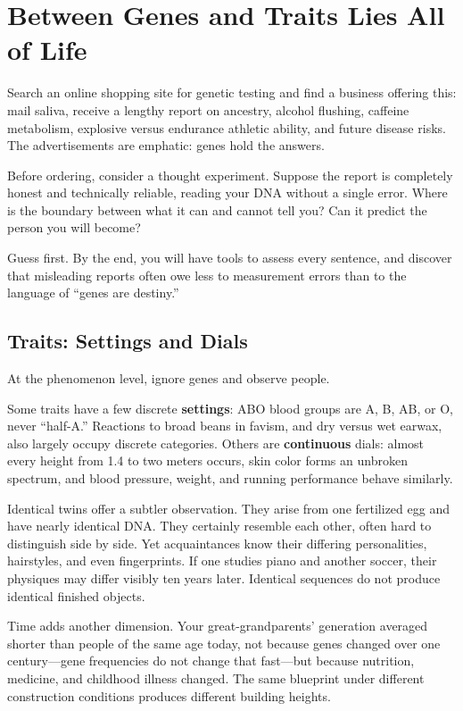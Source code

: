 \chapter{Between Genes and Traits Lies All of Life}

\begin{kaichang}
Search an online shopping site for genetic testing and find a business offering this: mail saliva, receive a lengthy report on ancestry, alcohol flushing, caffeine metabolism, explosive versus endurance athletic ability, and future disease risks. The advertisements are emphatic: genes hold the answers.

Before ordering, consider a thought experiment. Suppose the report is completely honest and technically reliable, reading your DNA without a single error. Where is the boundary between what it can and cannot tell you? Can it predict the person you will become?

Guess first. By the end, you will have tools to assess every sentence, and discover that misleading reports often owe less to measurement errors than to the language of ``genes are destiny.''
\end{kaichang}

\section{Traits: Settings and Dials}

At the phenomenon level, ignore genes and observe people.

Some traits have a few discrete \textbf{settings}: ABO blood groups are A, B, AB, or O, never ``half-A.'' Reactions to broad beans in favism, and dry versus wet earwax, also largely occupy discrete categories. Others are \textbf{continuous} dials: almost every height from 1.4 to two meters occurs, skin color forms an unbroken spectrum, and blood pressure, weight, and running performance behave similarly.

Identical twins offer a subtler observation. They arise from one fertilized egg and have nearly identical DNA. They certainly resemble each other, often hard to distinguish side by side. Yet acquaintances know their differing personalities, hairstyles, and even fingerprints. If one studies piano and another soccer, their physiques may differ visibly ten years later. Identical sequences do not produce identical finished objects.

Time adds another dimension. Your great-grandparents' generation averaged shorter than people of the same age today, not because genes changed over one century---gene frequencies do not change that fast---but because nutrition, medicine, and childhood illness changed. The same blueprint under different construction conditions produces different building heights.

